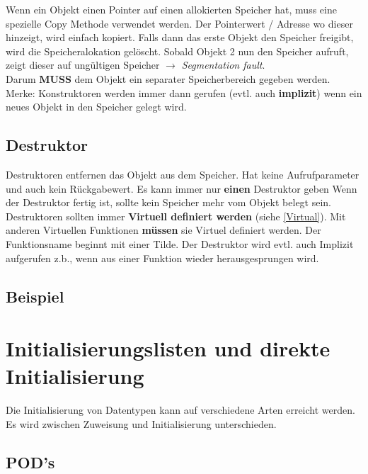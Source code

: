Wenn ein Objekt einen Pointer auf einen allokierten Speicher hat, muss eine spezielle Copy Methode verwendet werden. 
Der Pointerwert / Adresse wo dieser hinzeigt, wird einfach kopiert. 
Falls dann das erste Objekt den Speicher freigibt, wird die Speicheralokation gelöscht. 
Sobald Objekt 2 nun den Speicher aufruft, zeigt dieser auf ungültigen Speicher $\rightarrow$ \textit{Segmentation fault}.\\
Darum \textbf{MUSS} dem Objekt ein separater Speicherbereich gegeben werden.\\

Merke: Konstruktoren werden immer dann gerufen (evtl. auch \textbf{implizit}) wenn ein neues Objekt in den Speicher gelegt wird.\\

\subsection{Destruktor}

Destruktoren entfernen das Objekt aus dem Speicher. 
Hat keine Aufrufparameter und auch kein Rückgabewert. 
Es kann immer nur \textbf{einen} Destruktor geben
Wenn der Destruktor fertig ist, sollte kein Speicher mehr vom Objekt belegt sein.\\
Destruktoren sollten immer \textbf{Virtuell definiert werden} (siehe \ref{Virtual}). 
Mit anderen Virtuellen Funktionen \textbf{müssen} sie Virtuel definiert werden. 
Der Funktionsname beginnt mit einer Tilde. 
Der Destruktor wird evtl. auch Implizit aufgerufen z.b., wenn aus einer Funktion wieder herausgesprungen wird. 

\subsection{Beispiel}



\section{Initialisierungslisten und direkte Initialisierung}

Die Initialisierung von Datentypen kann auf verschiedene Arten erreicht werden. 
Es wird zwischen Zuweisung und Initialisierung unterschieden.

\subsection{POD's}

